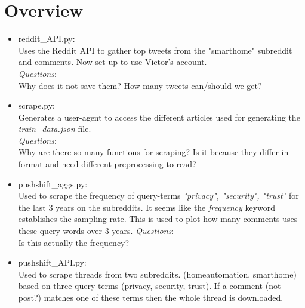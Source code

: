 \documentclass{article}
\begin{document}
\section{Overview}
\begin{itemize}
	\item reddit\_API.py:\\
	Uses the Reddit API to gather top tweets
	from the "smarthome" subreddit and comments.
	Now set up to use Victor's account.\\
	\emph{Questions}: \\ Why does it not save them?
	How many tweets can/should we get?
	\item scrape.py:\\
	Generates a user-agent to access the different
	articles used for generating the \textit{train\_data.json} file.\\
	\emph{Questions}: \\
	Why are there so many functions for scraping?
	Is it because they differ in format and need different preprocessing to read?
	\item pushshift\_aggs.py:\\
	Used to scrape the frequency of query-terms
	\textit{"privacy", "security", "trust"} for the last 3 years on the subreddits.
	It seems like the \textit{frequency} keyword establishes the sampling rate.
	This is used to plot how many comments uses these query words over 3 years.
	\emph{Questions}: \\
	Is this actually the frequency?
	\item pushshift\_API.py:\\
	Used to scrape threads from two subreddits.
	(homeautomation, smarthome) based on three
	query terms (privacy, security, trust). If
	a comment (not post?) matches one of these
	terms then the whole thread is downloaded.
\end{itemize}
\end{document}
